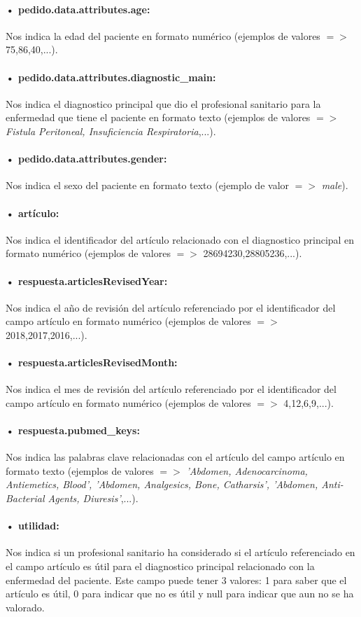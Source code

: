 \paragraph{• pedido.data.attributes.age:} Nos indica la edad del paciente en formato numérico (ejemplos de valores $=>$ 75,86,40,...).
\paragraph{• pedido.data.attributes.diagnostic\_main:} Nos indica el diagnostico principal que dio el profesional sanitario para la enfermedad que tiene el paciente en formato texto (ejemplos de valores $=>$ \textit{Fistula Peritoneal, Insuficiencia Respiratoria},...).
\paragraph{• pedido.data.attributes.gender:} Nos indica el sexo del paciente en formato texto (ejemplo de valor $=>$ \textit{male}).
\paragraph{• artículo:} Nos indica el identificador del artículo relacionado con el diagnostico principal en formato numérico (ejemplos de valores $=>$ 28694230,28805236,...).
\paragraph{• respuesta.articlesRevisedYear:} Nos indica el año de revisión del artículo referenciado por el identificador del campo artículo en formato numérico (ejemplos de valores $=>$ 2018,2017,2016,...).
\paragraph{• respuesta.articlesRevisedMonth:} Nos indica el mes de revisión del artículo referenciado por el identificador del campo artículo en formato numérico (ejemplos de valores $=>$ 4,12,6,9,...).
\paragraph{• respuesta.pubmed\_keys:} Nos indica las palabras clave relacionadas con el artículo del campo artículo en formato texto (ejemplos de valores $=>$ \textit{'Abdomen, Adenocarcinoma, Antiemetics, Blood', 'Abdomen, Analgesics, Bone, Catharsis', 'Abdomen, Anti-Bacterial Agents, Diuresis'},...).
\label{section:analisis_datos_utilidad}
\paragraph{• utilidad:} Nos indica si un profesional sanitario ha considerado si el artículo referenciado en el campo artículo es útil para el diagnostico principal relacionado con la enfermedad del paciente. Este campo puede tener 3 valores: 1 para saber que el artículo es útil, 0 para indicar que no es útil y null para indicar que aun no se ha valorado.
